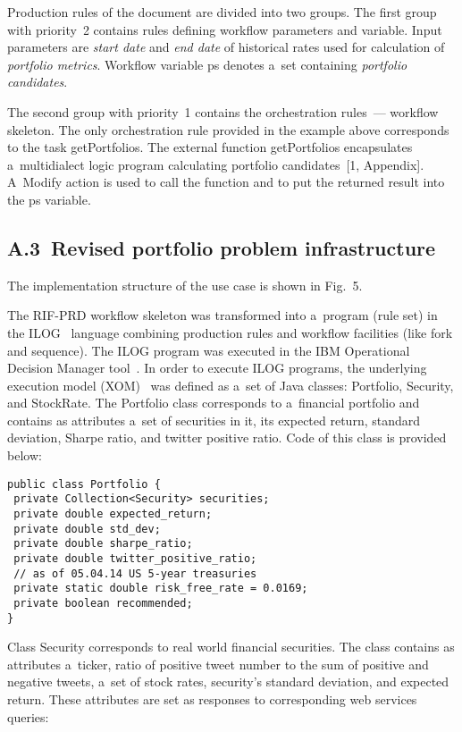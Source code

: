 \begin{multicols}{2}
{  Production rules of the document are divided into two groups. The first group with
priority~2 contains rules defining workflow parameters and variable. Input parameters
are \textit{start date} and \textit{end date} of historical rates used for calculation of
\textit{portfolio metrics}. Workflow variable {\sf ps} denotes a~set containing
\textit{portfolio candidates}.

  The second group with priority~1 contains the orchestration rules~--- workflow
skeleton. The only orchestration rule provided in the example above corresponds to
the task {\sf getPortfolios}. The external function {\sf getPortfolios}
encapsulates a~multidialect logic program calculating portfolio candidates~[1,
Appendix]. A~{\sf Modify} action is used to call the function and to put the
returned result into the {\sf ps} variable.

\vspace*{-6pt}

\subsection*{A.3\	Revised portfolio problem infrastructure}

  \noindent
  The implementation structure of the use case is shown in Fig.~5.




  The RIF-PRD workflow skeleton was transformed into a~program (rule set) in the
ILOG~\cite{13-kal} language combining production rules and workflow facilities
(like {\sf fork} and {\sf sequence}). The ILOG program was executed in the
{IBM Operational Decision Manager} tool~\cite{24-kal}. In order to execute
ILOG programs, the underlying execution model (XOM)~\cite{25-kal}
was defined as a~set of
Java classes: {\sf Portfolio}, {\sf Security}, and {\sf StockRate}. The
{\sf Portfolio class} corresponds to a~financial portfolio and contains as attributes a~set of
securities in it, its expected return, standard deviation, Sharpe ratio, and twitter
positive ratio. Code of this class is provided below:
  \begin{verbatim}
public class Portfolio {
 private Collection<Security> securities;
 private double expected_return;
 private double std_dev;
 private double sharpe_ratio;
 private double twitter_positive_ratio;
 // as of 05.04.14 US 5-year treasuries
 private static double risk_free_rate = 0.0169;
 private boolean recommended;
}
\end{verbatim}

  Class {\sf Security} corresponds to real world financial securities. The class
contains as attributes a~ticker, ratio of positive tweet number to the sum of positive
and negative tweets, a~set of stock rates, security's standard deviation, and expected
return. These attributes are set as responses to corresponding web services queries:

}
\end{multicols}
